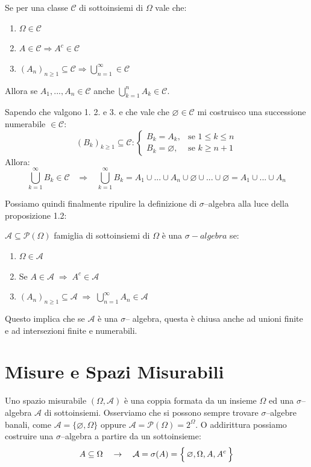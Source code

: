 \begin{proposizione}
    Se per una classe $\mathcal{C}$ di sottoinsiemi di $\Omega$ vale che:
    \begin{enumerate}
        \item $\Omega \in \mathcal{C}$
        \item $A \in \mathcal{C} \Rightarrow A^c \in \mathcal{C}$
        \item $(A_n)_{n\geq1} \subseteq \mathcal{C} \Rightarrow \bigcup_{n=1}^\infty \in \mathcal{C}$
    \end{enumerate}
        Allora se $A_1, ..., A_n \in \mathcal{C}$ anche $\bigcup_{k=1}^{n} A_k \in \mathcal{C}$.
\begin{dimostrazione}
    Sapendo che valgono 1. 2. e 3. e che vale che $\varnothing \in \mathcal{C}$ mi costruisco una successione numerabile $\in \mathcal{C}$:
    \[(B_k)_{k\geq1} \subseteq \mathcal{C}: 
    \begin{cases} 
    B_k = A_k, & \text{se } 1\leq k\leq n \\ 
    B_k = \varnothing, & \text{se } k \geq n+1
    \end{cases}
\]
Allora: \[\bigcup_{k=1}^{\infty} B_k \in \mathcal{C} \;\;\; \Rightarrow \;\;\; \bigcup_{k=1}^{\infty} B_k = A_1 \cup ...\cup A_n \cup \varnothing  \cup ...\cup \varnothing  = A_1 \cup ... \cup A_n\]
\end{dimostrazione}
\end{proposizione}
Possiamo quindi finalmente ripulire la definizione di $\sigma$--algebra alla luce della proposizione 1.2:

\begin{definizione}
    $\mathcal{A} \subseteq \mathcal{P}(\Omega)$ famiglia di sottoinsiemi di $\Omega$ è una $\sigma-algebra$ se: 
\begin{enumerate}
    \item $\Omega \in \mathcal{A}$ 
    \item Se $A \in \mathcal{A} \;\Rightarrow\; A^c \in \mathcal{A}$ 
    \item $(A_n)_{n \geq 1} \subseteq \mathcal{A} \;\Rightarrow\; \bigcup_{n=1}^{\infty} A_n \in \mathcal{A}$ 
\end{enumerate}
\end{definizione}
Questo implica che se $\mathcal{A}$ è una $\sigma$-- algebra, questa è chiusa anche ad unioni finite e ad intersezioni finite e numerabili.\\

\section{Misure e Spazi Misurabili}
Uno spazio misurabile $(\Omega, \mathcal{A})$ è una coppia formata da un insieme $\Omega$ ed una $\sigma$--algebra $\mathcal{A}$ di sottoinsiemi. Osserviamo che si possono sempre trovare $\sigma$--algebre banali, come $\mathcal{A} = \{\varnothing, \Omega\}$ oppure $\mathcal{A} = \mathcal{P}(\Omega) = 2^\Omega$. O addirittura possiamo costruire una $\sigma$--algebra a partire da un sottoinsieme:
\[A\subseteq \Omega \quad \rightarrow \quad \mathcal{A} = \sigma (A) = \Bigl\{\,\varnothing, \Omega, A, A^c\,\Bigr\}\]


